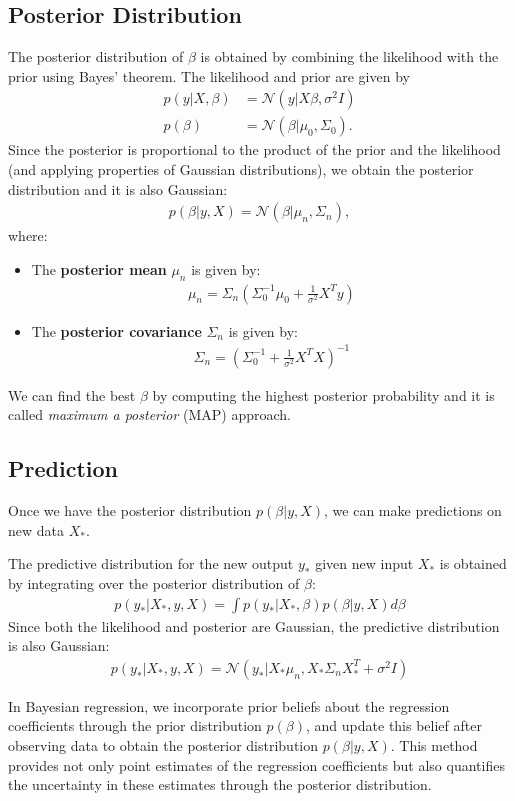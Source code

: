 \subsection{Posterior Distribution}
The posterior distribution of $\beta$ is obtained by combining the likelihood with the prior using Bayes' theorem. The likelihood and prior are given by
\begin{align*}
	p(y | X, \beta) &= \mathcal{N}(y | X\beta, \sigma^2 I)\\
	p(\beta) &= \mathcal{N}(\beta | \mu_0, \Sigma_0).
\end{align*}
Since the posterior is proportional to the product of the prior and the likelihood (and applying properties of Gaussian distributions), we obtain the posterior distribution and it is also Gaussian:
\begin{align*}
	p(\beta | y, X) = \mathcal{N}(\beta | \mu_n, \Sigma_n),
\end{align*}
where:
\begin{itemize}
    \item The \textbf{posterior mean} $\mu_n$ is given by:
		\begin{align*}
			\mu_n = \Sigma_n \left( \Sigma_0^{-1} \mu_0 + \frac{1}{\sigma^2} X^T y \right)
		\end{align*}
    \item The \textbf{posterior covariance} $\Sigma_n$ is given by:
		\begin{align*}
			\Sigma_n = \left( \Sigma_0^{-1} + \frac{1}{\sigma^2} X^T X \right)^{-1}
		\end{align*}
\end{itemize}
We can find the best $\beta$ by computing the highest posterior probability and it is called \textit{maximum a posterior} (MAP) approach. 



\subsection{Prediction}
Once we have the posterior distribution $ p(\beta | y, X) $, we can make predictions on new data $ X_*$.

The predictive distribution for the new output $ y_* $ given new input $ X_* $ is obtained by integrating over the posterior distribution of $\beta$:
\begin{align*}
	p(y_* | X_*, y, X) = \int p(y_* | X_*, \beta) p(\beta | y, X) d\beta
\end{align*}
Since both the likelihood and posterior are Gaussian, the predictive distribution is also Gaussian:
\begin{align*}
	p(y_* | X_*, y, X) = \mathcal{N}(y_* | X_*\mu_n, X_*\Sigma_n X_*^T + \sigma^2 I)
\end{align*}

In Bayesian regression, we incorporate prior beliefs about the regression coefficients through the prior distribution $ p(\beta) $, and update this belief after observing data to obtain the posterior distribution $ p(\beta | y, X) $. This method provides not only point estimates of the regression coefficients but also quantifies the uncertainty in these estimates through the posterior distribution.

